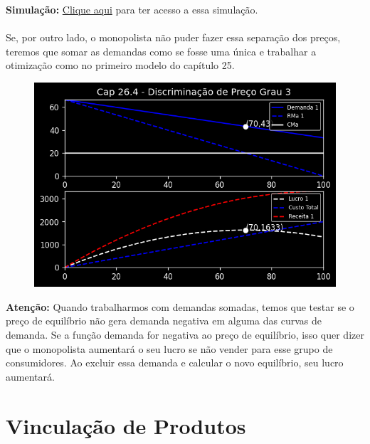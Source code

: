 \documentclass[a4paper,11pt,oneside]{book}
\theoremstyle{definition}
\theoremstyle{break}
\begin{document}
\textbf{Simulação:} \href{https://colab.research.google.com/drive/1TYSpJLSEg4yInKX_viA6aP8qLiRsHdBm?usp=sharing}{Clique aqui} para ter acesso a essa simulação.
\\~\\
Se, por outro lado, o monopolista não puder fazer essa separação dos preços, teremos que somar as demandas como se fosse uma única e trabalhar a otimização como no primeiro modelo do capítulo 25.

\begin{figure}[H]
\centering
\includegraphics[scale=0.8]{cap26_4-discriminacao_grau3_2.png}
\end{figure}

\textbf{Atenção:} Quando trabalharmos com demandas somadas, temos que testar se o preço de equilíbrio não gera demanda negativa em alguma das curvas de demanda. Se a função demanda for negativa ao preço de equilíbrio, isso quer dizer que o monopolista aumentará o seu lucro se não vender para esse grupo de consumidores. Ao excluir essa demanda e calcular o novo equilíbrio, seu lucro aumentará.

\section{Vinculação de Produtos}
\end{document}
